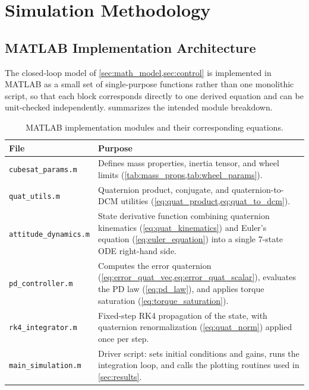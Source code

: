\section{Simulation Methodology}
\label{sec:methodology}

\subsection{MATLAB Implementation Architecture}
\label{sec:matlab_architecture}

The closed-loop model of \cref{sec:math_model,sec:control} is implemented in MATLAB as a small set of single-purpose functions rather than one monolithic script, so that each block corresponds directly to one derived equation and can be unit-checked independently.  summarizes the intended module breakdown.

\begin{table}[htbp]
\centering
\caption{MATLAB implementation modules and their corresponding equations.}
\label{tab:matlab_files}
\begin{tabular}{@{}p{4.2cm}p{9.3cm}@{}}
\toprule
File & Purpose \\
\midrule
\texttt{cubesat\_params.m} & Defines mass properties, inertia tensor, and wheel limits (\cref{tab:mass_props,tab:wheel_params}). \\
\texttt{quat\_utils.m} & Quaternion product, conjugate, and quaternion-to-DCM utilities (\cref{eq:quat_product,eq:quat_to_dcm}). \\
\texttt{attitude\_dynamics.m} & State derivative function combining quaternion kinematics (\cref{eq:quat_kinematics}) and Euler's equation (\cref{eq:euler_equation}) into a single 7-state ODE right-hand side. \\
\texttt{pd\_controller.m} & Computes the error quaternion (\cref{eq:error_quat_vec,eq:error_quat_scalar}), evaluates the PD law (\cref{eq:pd_law}), and applies torque saturation (\cref{eq:torque_saturation}). \\
\texttt{rk4\_integrator.m} & Fixed-step RK4 propagation of the state, with quaternion renormalization (\cref{eq:quat_norm}) applied once per step. \\
\texttt{main\_simulation.m} & Driver script: sets initial conditions and gains, runs the integration loop, and calls the plotting routines used in \cref{sec:results}. \\
\bottomrule
\end{tabular}
\end{table}

